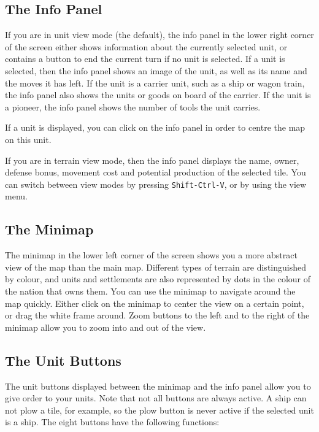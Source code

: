 \documentclass[12pt]{book}
\begin{document}
\hypertarget{info panel}{\subsection{The Info Panel}}

If you are in unit view mode (the default), the info panel in the
lower right corner of the screen either shows information about the
currently selected unit, or contains a button to end the current turn
if no unit is selected. If a unit is selected, then the info panel
shows an image of the unit, as well as its name and the moves it has
left. If the unit is a carrier unit, such as a ship or wagon train,
the info panel also shows the units or goods on board of the
carrier. If the unit is a pioneer, the info panel shows the number of
tools the unit carries.

If a unit is displayed, you can click on the info panel in order to
centre the map on this unit.

If you are in terrain view mode, then the info panel displays the
name, owner, defense bonus, movement cost and potential production of
the selected tile. You can switch between view modes by pressing
\verb$Shift-Ctrl-V$, or by using the view menu.


\hypertarget{minimap}{\subsection{The Minimap}}

The minimap in the lower left corner of the screen shows you a more
abstract view of the map than the main map. Different types of terrain
are distinguished by colour, and units and settlements are also
represented by dots in the colour of the nation that owns them. You
can use the minimap to navigate around the map quickly.  Either click
on the minimap to center the view on a certain point, or drag the
white frame around. Zoom buttons to the left and to the right of the
minimap allow you to zoom into and out of the view.


\hypertarget{unit buttons}{\subsection{The Unit Buttons}}

The unit buttons displayed between the minimap and the info panel
allow you to give order to your units. Note that not all buttons are
always active. A ship can not plow a tile, for example, so the plow
button is never active if the selected unit is a ship. The eight
buttons have the following functions:
\end{document}
